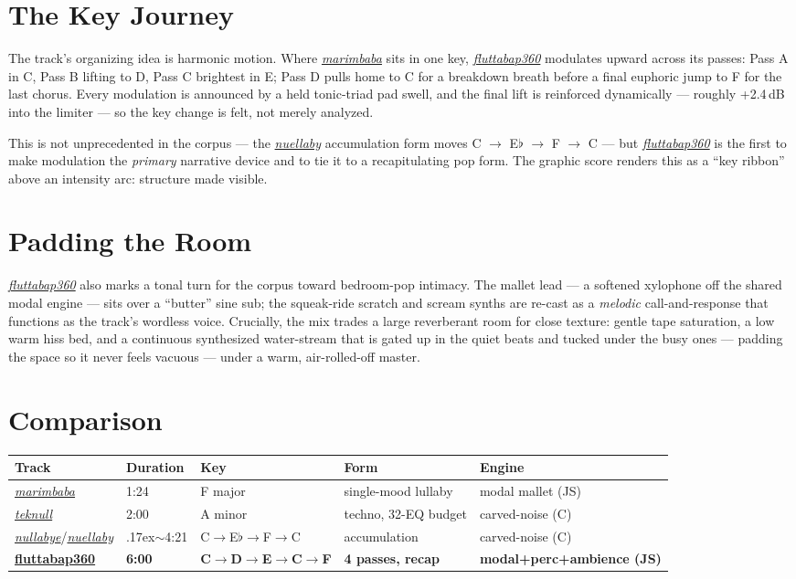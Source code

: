 \documentclass[11pt,letterpaper]{article}
\newcommand{\trk}[2]{\href{https://assets.aesthetic.computer/pop/#1.mp3}{\textit{#2}}}
\newcommand{\fl}{\trk{fluttabap360}{fluttabap360}}
\begin{document}
\section{The Key Journey}

The track's organizing idea is harmonic motion. Where \trk{marimbaba}{marimbaba} sits in one key, \fl{} modulates upward across its passes: Pass A in C, Pass B lifting to D, Pass C brightest in E; Pass D pulls home to C for a breakdown breath before a final euphoric jump to F for the last chorus. Every modulation is announced by a held tonic-triad pad swell, and the final lift is reinforced dynamically --- roughly +2.4\,dB into the limiter --- so the key change is felt, not merely analyzed.

This is not unprecedented in the corpus --- the \trk{nuellaby}{nuellaby} accumulation form moves C $\to$ E$\flat$ $\to$ F $\to$ C --- but \fl{} is the first to make modulation the \textit{primary} narrative device and to tie it to a recapitulating pop form. The graphic score renders this as a ``key ribbon'' above an intensity arc: structure made visible.

\section{Padding the Room}

\fl{} also marks a tonal turn for the corpus toward bedroom-pop intimacy. The mallet lead --- a softened xylophone off the shared modal engine --- sits over a ``butter'' sine sub; the squeak-ride scratch and scream synths are re-cast as a \textit{melodic} call-and-response that functions as the track's wordless voice. Crucially, the mix trades a large reverberant room for close texture: gentle tape saturation, a low warm hiss bed, and a continuous synthesized water-stream that is gated up in the quiet beats and tucked under the busy ones --- padding the space so it never feels vacuous --- under a warm, air-rolled-off master.

\section{Comparison}

\begin{center}
\small
\begin{tabular}{@{}lllll@{}}
\toprule
Track & Duration & Key & Form & Engine \\
\midrule
\trk{marimbaba}{marimbaba} & 1:24 & F major & single-mood lullaby & modal mallet (JS) \\
\trk{teknull}{teknull} & 2:00 & A minor & techno, 32-EQ budget & carved-noise (C) \\
\trk{nullabye}{nullabye}/\trk{nuellaby}{nuellaby} & {\raise.17ex\hbox{$\scriptstyle\sim$}}4:21 & C$\to$E$\flat$$\to$F$\to$C & accumulation & carved-noise (C) \\
\href{https://assets.aesthetic.computer/pop/fluttabap360.mp3}{\textbf{fluttabap360}} & \textbf{6:00} & \textbf{C$\to$D$\to$E$\to$C$\to$F} & \textbf{4 passes, recap} & \textbf{modal+perc+ambience (JS)} \\
\bottomrule
\end{tabular}
\end{center}
\end{document}
